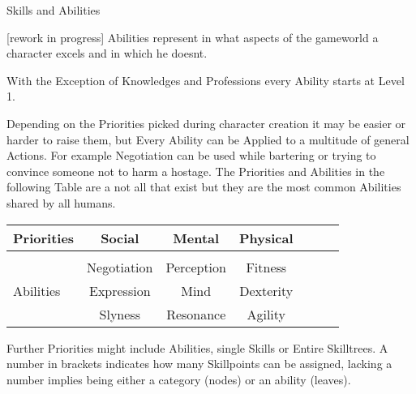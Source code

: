 \documentclass{article}
\newcommand{\subhline}[1]{\begin{center}\large #1 \normalsize \end{center}}
\begin{document}
    \subhline{Skills and Abilities}
    [rework in progress]
    Abilities represent in what aspects of the gameworld a character excels and in which he doesnt.

    With the Exception of Knowledges and Professions every Ability starts at Level 1. \par
    Depending on the Priorities picked during character creation it may be easier or harder to raise them, but Every
    Ability can be Applied to a multitude of general Actions. For example Negotiation can be used while bartering or trying
    to convince someone not to harm a hostage. The Priorities and Abilities in the following Table are a not all that exist
    but they are the most common Abilities shared by all humans.\newline\newline

    \begin{tabular}{l||cccccc}
        Priorities       &Social       &Mental         &Physical      \\\hline\\
        &Negotiation  &Perception     &Fitness        \\
        Abilities       &Expression   &Mind           &Dexterity      \\
        &Slyness      &Resonance      &Agility        \\
    \end{tabular}\newline

    \pagebreak

    Further Priorities might include Abilities, single Skills or Entire Skilltrees. A number in brackets indicates how many
    Skillpoints can be assigned, lacking a number implies being either a category (nodes) or an ability (leaves).
\end{document}
